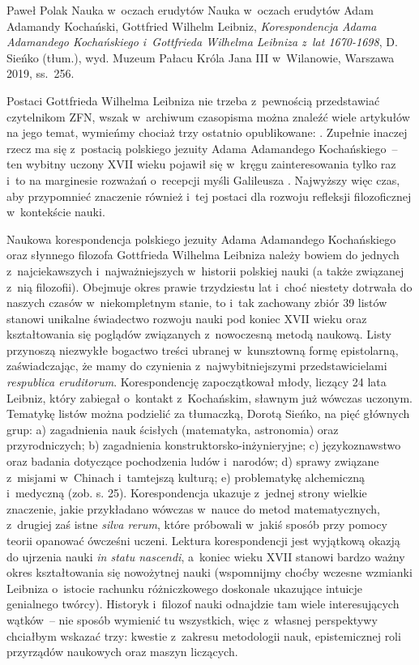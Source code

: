 \begin{recplenv}{Paweł Polak}
	{Nauka w~oczach erudytów}
	{Nauka w~oczach erudytów}
	{Adam Adamandy Kochański, Gottfried Wilhelm Leibniz, \textit{Korespondencja Adama Adamandego Kochańskiego i~Gottfrieda Wilhelma Leibniza z~lat 1670-1698}, D. Sieńko (tłum.), wyd. Muzeum Pałacu Króla Jana III w~Wilanowie, Warszawa 2019, ss.~256.}
	

Postaci Gottfrieda Wilhelma Leibniza nie trzeba z~pewnością przedstawiać czytelnikom ZFN, wszak w~archiwum czasopisma
można znaleźć wiele artykułów na jego temat, wymieńmy chociaż trzy ostatnio opublikowane:
\parencite{heller_wyzwanie_2016,bubula_woluntaryzm_2011,heller_stworzenie_2008}.
Zupełnie inaczej rzecz ma się z~postacią polskiego jezuity Adama
Adamandego Kochańskiego~-- ten wybitny uczony XVII wieku pojawił się w~kręgu zainteresowania tylko raz i~to na
marginesie rozważań o~recepcji myśli Galileusza
\parencite{targosz_polski_2003}.
Najwyższy więc czas, aby
przypomnieć znaczenie również i~tej postaci dla rozwoju refleksji filozoficznej w~kontekście nauki.

\enlargethispage{.5\baselineskip}

Naukowa korespondencja polskiego jezuity Adama Adamandego Kochańskiego oraz słynnego filozofa Gottfrieda Wilhelma
Lei\-bniza należy bowiem do jednych z~najciekawszych i~najważniejszych w~historii polskiej nauki (a także związanej z~nią
filozofii). Obejmuje okres prawie trzydziestu lat i~choć niestety dotrwała do naszych czasów w~niekompletnym stanie,
to i~tak zachowany zbiór 39 listów stanowi unikalne świadectwo rozwoju nauki pod koniec XVII wieku oraz kształtowania się
poglądów związanych z~nowoczesną metodą naukową. Listy przynoszą niezwykłe bogactwo treści ubranej w~kunsztowną formę
epistolarną, zaświadczając, że mamy do czynienia z~najwybitniejszymi przedstawicielami \textit{respublica eruditorum}.
Korespondencję zapoczątkował młody, liczący 24 lata Leibniz, który zabiegał o~kontakt z~Kochańskim, sławnym już wówczas
uczonym. Tematykę listów można podzielić za tłumaczką, Dorotą Sieńko, na pięć głównych grup: a) zagadnienia nauk
ścisłych (matematyka, astronomia) oraz przyrodniczych; b) zagadnienia konstruktorsko-inżynieryjne; c) językoznawstwo
oraz badania dotyczące pochodzenia ludów i~narodów; d) sprawy związane z~misjami w~Chinach i~tamtejszą kulturą; e)
problematykę alchemiczną i~medyczną (zob. s. 25). Korespondencja ukazuje z~jednej strony wielkie znaczenie, jakie
przykładano wówczas w~nauce do metod matematycznych, z~drugiej zaś istne \textit{silva rerum}, które próbowali w~jakiś
sposób przy pomocy teorii opanować ówcześni uczeni. Lektura korespondencji jest wyjątkową okazją do ujrzenia nauki
\textit{in statu nascendi}, a~koniec wieku XVII stanowi bardzo ważny okres kształtowania się nowożytnej nauki
(wspomnijmy choćby wczesne wzmianki Leibniza o~istocie rachunku różniczkowego doskonale ukazujące intuicje genialnego
twórcy). Historyk i~filozof nauki odnajdzie tam wiele interesujących wątków~-- nie sposób wymienić tu wszystkich, więc z~własnej
perspektywy chciałbym wskazać trzy: kwestie z~zakresu metodologii nauk, epistemicznej roli przyrządów naukowych
oraz maszyn liczących.


\end{recplenv}

